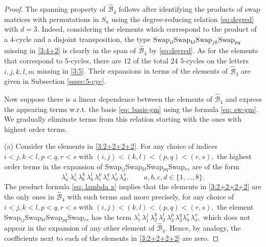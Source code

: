 \documentclass[12pt,dvipsnames,accepted=2016-08-18,a4paper,onecolumn]{quantumarticle}
\numberwithin{equation}{section}
\newcommand{\cB}{\mathcal B}
\theoremstyle{definition}
\begin{document}
\begin{proof}
 The spanning property of $\hat{\cB}_4$ follows after identifying the products of swap matrices with permutations in $S_n$ using the degree-reducing relation \eqref{eq:degred} with $d=3.$ Indeed, considering the elements which correspond to the product of a $4$-cycle and a disjoint transposition, the type $\textnormal{Swap}_{il} \textnormal{Swap}_{kl} \textnormal{Swap}_{jk} \text{Swap}_{pq}$ missing in \eqref{3:4+2}   is clearly in the span of  $\hat{\cB}_4$ by \eqref{eq:degred}.
 As for the elements that correspond to $5$-cycles, there are  $12$ of the total $24$ $5$-cycles on the letters $i,j,k,l,m$ missing in \eqref{3:5}.
 Their expansions in terms of the elements of $\hat{\cB}_4$ are given in Subsection \ref{sssec:5-cyc}.
 
 Now suppose there is a linear dependence between the elements of $\hat{\cB}_4$  and express the appearing terms w.r.t. the basis \eqref{eq: basis-gm} using the formula  \eqref{eq: sw-gm}. We gradually eliminate terms from this relation starting with the ones with highest order terms.

 
 (a) Consider the elements in \eqref{3:2+2+2+2}. For any choice of indices $i < j, k < l,  p < q, r < s$ with  $(i,j) < (k,l) < (p,q)<(r,s),$ the highest order terms in the expansion of Swap$_{ij}$Swap$_{kl}$Swap$_{pq}$Swap$_{rs}$ are of the form
	$$
	\lambda_a^i\, \lambda_a^j\, \lambda_b^k\, \lambda_b^l\, \lambda_c^p\, \lambda_c^q \, \lambda_d^r\, \lambda_d^s, \quad \quad a,b,c,d \in \{1,\ldots,8\}.
	$$
	The product formula \eqref{eq: lambda x} implies that the elements in \eqref{3:2+2+2+2} are the only ones in $\hat{\cB}_4$ with such terms and more precisely, for any choice of $i < j, k < l,  p < q, r < s$ with  $(i,j) < (k,l) < (p,q)<(r,s),$ the element Swap$_{ij}$Swap$_{kl}$Swap$_{pq}$Swap$_{rs}$  has the term $\lambda_1^i\, \lambda_1^j\, \lambda_2^k\, \lambda_2^l\, \lambda_3^p\, \lambda_3^q\lambda_4^r\, \lambda_4^s,$
	which does not appear in the expansion of any other element of $\hat{\cB}_4.$ Hence, by analogy, the coefficients next to each of the elements in \eqref{3:2+2+2+2} are zero. 



\end{proof}
\end{document}
